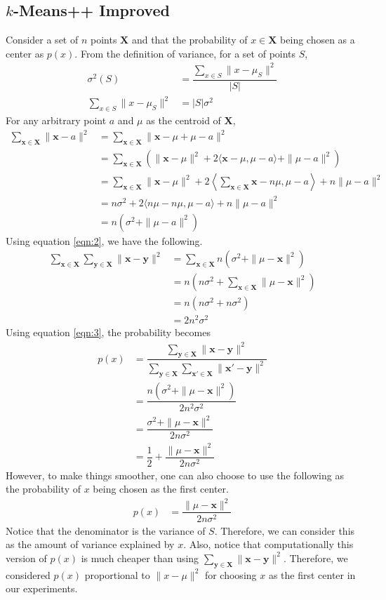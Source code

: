 \documentclass[twoside, 11pt]{article}
\newcommand{\x}{\mathbf{x}}
\newcommand{\X}{\mathbf{X}}
\newcommand{\y}{\mathbf{y}}
\begin{document}
	\subsection{$k$-Means++ Improved}
	Consider a set of $n$ points $\X$ and that the probability of $x\in\X$ being chosen as a center as $p(x)$. From the definition of variance, for a set of points $S$,
		\begin{align}
			\sigma^2(S) & = \dfrac{\sum_{x\in S} \|x-\mu_{S}\|^2}{|S|}\nonumber\\
			\sum_{x\in S}\|x-\mu_{S}\|^2 & = |S|\sigma^2\label{eqn:1}
		\end{align}
	For any arbitrary point $a$ and $\mu$ as the centroid of $\X$,
		\begin{align}
			\sum_{\x\in\X}\|\x-a\|^2
				  & = \sum_{\x\in\X}\|\x-\mu+\mu-a\|^2\nonumber\\
				  & = \sum_{\x\in\X}\left(\|\x-\mu\|^2+2\langle\x-\mu,\mu-a\rangle+\|\mu-a\|^2\right)\nonumber\\
				  & = \sum_{\x\in\X}\|\x-\mu\|^2+2\left\langle\sum_{\x\in\X}\x-n\mu,\mu-a\right\rangle+n\|\mu-a\|^2\nonumber\\
				  & = n\sigma^2+2\langle n\mu-n\mu,\mu-a\rangle+n\|\mu-a\|^2\nonumber\\
				  & = n(\sigma^2+\|\mu-a\|^2)\label{eqn:2}
		\end{align}
	Using equation \eqref{eqn:2}, we have the following.
		\begin{align}
			\sum_{\x\in\X}\sum_{\y\in\X}\|\x-\y\|^2 
				& = \sum_{\x\in\X}n(\sigma^2+\|\mu-\x\|^2)\nonumber\\
				& = n(n\sigma^2+\sum_{\x\in\X}\|\mu-\x\|^2)\nonumber\\
				& = n(n\sigma^2+n\sigma^2)\nonumber\\
				& = 2n^2\sigma^2\label{eqn:3}
		\end{align}
	Using equation \eqref{eqn:3}, the probability becomes
		\begin{align*}
			p(x) & = \dfrac{\sum_{\y\in\X}\|\x-\y\|^2}{\sum_{\y\in\X}\sum_{\x'\in\X}\|\x'-\y\|^2}\\
				 & = \dfrac{n(\sigma^2+\|\mu-\x\|^2)}{2n^2\sigma^2}\\
				 & = \dfrac{\sigma^2+\|\mu-\x\|^2}{2n\sigma^2}\\
				 & = \dfrac{1}{2}+\dfrac{\|\mu-\x\|^2}{2n\sigma^2}
		\end{align*}
	However, to make things smoother, one can also choose to use the following as the probability of $x$ being chosen as the first center.
		\begin{align*}
			p(x) & = \dfrac{\|\mu-\x\|^2}{2n\sigma^2}
		\end{align*}
	Notice that the denominator is the variance of $S$. Therefore, we can consider this as the amount of variance explained by $x$. Also, notice that computationally this version of $p(x)$ is much cheaper than using $\sum_{\y\in\X}\|\x-\y\|^2$. Therefore, we considered $p(x)$ proportional to $\|x-\mu\|^2$ for choosing $x$ as the first center in our experiments.
\end{document}
